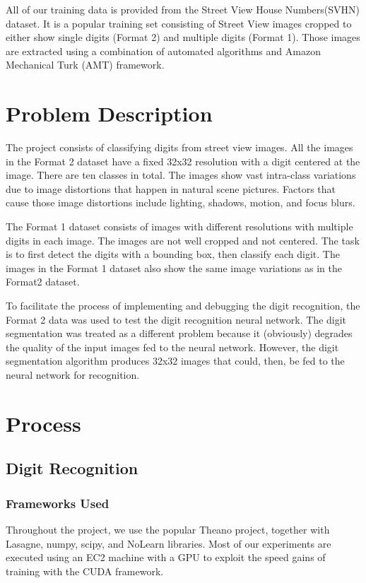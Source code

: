 \documentclass{article} %
\begin{document}
All of our training data is provided from the Street View House Numbers(SVHN)\cite{svhn} dataset. It is a popular training set consisting of Street View images cropped to either show single digits (Format 2) and multiple digits (Format 1). Those images are extracted using a combination of automated algorithms and Amazon Mechanical Turk (AMT) framework.


\section{Problem Description}
The project consists of classifying digits from street view images. All the images in the Format 2 dataset have a fixed 32x32 resolution with a digit centered at the image. There are ten classes in total. The images show vast intra-class variations due to image distortions that happen in natural scene pictures. Factors that cause those image distortions include lighting, shadows, motion, and focus blurs.

The Format 1 dataset consists of images with different resolutions with multiple digits in each image. The images are not well cropped and not centered. The task is to first detect the digits with a bounding box, then classify each digit. The images in the Format 1 dataset also show the same image variations as in the Format2 dataset.

To facilitate the process of implementing and debugging the digit recognition, the Format 2 data was used to test the digit recognition neural network. The digit segmentation was treated as a different problem because it (obviously) degrades the quality of the input images fed to the neural network. However, the digit segmentation algorithm produces 32x32 images that could, then, be fed to the neural network for recognition.

\section{Process}
\subsection{Digit Recognition}
\subsubsection{Frameworks Used}
Throughout the project, we use the popular Theano project\cite{theano}, together with Lasagne\cite{lasagne}, numpy, scipy\cite{numpyscipy}, and NoLearn\cite{nolearn} libraries. Most of our experiments are executed using an EC2 machine with a GPU to exploit the speed gains of training with the CUDA framework.
\end{document}
